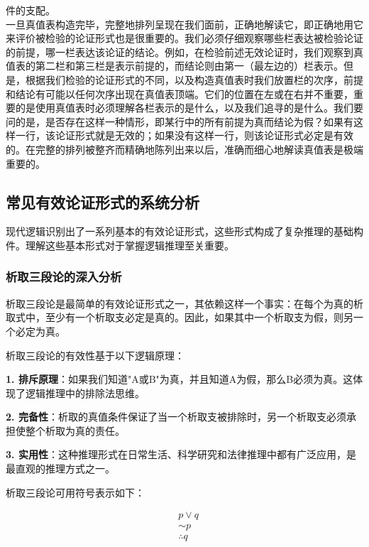 件的支配。\\
一旦真值表构造完毕，完整地排列呈现在我们面前，正确地解读它，即正确地用它来评价被检验的论证形式也是很重要的。我们必须仔细观察哪些栏表达被检验论证的前提，哪一栏表达该论证的结论。例如，在检验前述无效论证时，我们观察到真值表的第二栏和第三栏是表示前提的，而结论则由第一（最左边的）栏表示。但是，根据我们检验的论证形式的不同，以及构造真值表时我们放置栏的次序，前提和结论有可能以任何次序出现在真值表顶端。它们的位置在左或在右并不重要，重要的是使用真值表时必须理解各栏表示的是什么，以及我们追寻的是什么。我们要问的是，是否存在这样一种情形，即某行中的所有前提为真而结论为假？如果有这样一行，该论证形式就是无效的；如果没有这样一行，则该论证形式必定是有效的。在完整的排列被整齐而精确地陈列出来以后，准确而细心地解读真值表是极端重要的。

\subsection{常见有效论证形式的系统分析}

现代逻辑识别出了一系列基本的有效论证形式，这些形式构成了复杂推理的基础构件。理解这些基本形式对于掌握逻辑推理至关重要。

\subsubsection{析取三段论的深入分析}

析取三段论是最简单的有效论证形式之一，其依赖这样一个事实：在每个为真的析取式中，至少有一个析取支必定是真的。因此，如果其中一个析取支为假，则另一个必定为真。

\begin{theorembox}[title=析取三段论的逻辑原理]
析取三段论的有效性基于以下逻辑原理：

\textbf{1. 排斥原理}：如果我们知道"A或B"为真，并且知道A为假，那么B必须为真。这体现了逻辑推理中的排除法思维。

\textbf{2. 完备性}：析取的真值条件保证了当一个析取支被排除时，另一个析取支必须承担使整个析取为真的责任。

\textbf{3. 实用性}：这种推理形式在日常生活、科学研究和法律推理中都有广泛应用，是最直观的推理方式之一。
\end{theorembox}

析取三段论可用符号表示如下：

$$
\begin{aligned}
& p \vee q \\
& \sim p \\
& \therefore q
\end{aligned}
$$

